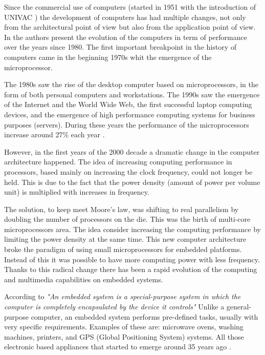 Since the commercial use of computers (started in 1951 with the introduction of
UNIVAC \cite{Nur}) the development of computers has had multiple changes, not
only from the architectural point of view but also from the application point
of view. In \cite{Hennessy} the authors present the evolution of the computers
in term of performance over the years since 1980. The first important
breakpoint in the history of computers came in the beginning 1970s whit the
emergence of the microprocessor. 

The 1980s saw the rise of the desktop computer based on microprocessors, in the
form of both personal computers and workstations. The 1990s saw the emergence
of the Internet and the World Wide Web, the first successful laptop computing
devices, and the emergence of high performance computing systems for business
purposes (servers). During these years the performance of the microprocessors
increase around 27\% each year \cite{Hennessy}.

However, in the first years of the 2000 decade a dramatic change in the
computer architecture happened. The idea of increasing computing performance in
processors, based mainly on increasing the clock frequency, could not longer be
held. This is due to the fact that the power density (amount of power per
volume unit) is multiplied with increases in frequency. 

The solution, to keep meet Moore's \cite{Mack} law, was shifting to real parallelism by
doubling the number of processors on the die. This was the birth of multi-core
microprocessors area. The idea consider increasing the computing performance
by limiting the power density at the same time. This new computer architecture
broke the paradigm of using small microprocessors for embedded platforms.
Instead of this it was possible to have more computing power with less
frequency. Thanks to this radical change there has been a rapid evolution of
the computing and multimedia capabilities on embedded systems. 


According to \cite{Hallinan}  \textit{"An embedded system is a special-purpose
system in which the computer is completely encapsulated by the device it
controls"} Unlike a general-purpose computer, an embedded system performs
pre-defined tasks, usually with very specific requirements. Examples of these
are: microwave ovens, washing machines, printers, and GPS (Global Positioning
System) systems. All those electronic based appliances that started to emerge
around 35 years ago \cite{Nur}. 

